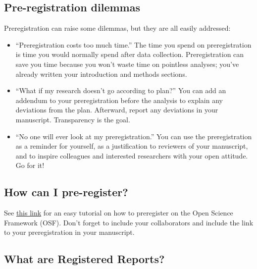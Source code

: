 \documentclass[
  letterpaper,
  DIV=11,
  numbers=noendperiod]{scrreprt}
\begin{document}
\hypertarget{pre-registration-dilemmas}{%
\subsection*{\texorpdfstring{\textbf{Pre-registration
dilemmas}}{Pre-registration dilemmas}}\label{pre-registration-dilemmas}}

Preregistration can raise some dilemmas, but they are all easily
addressed:

\begin{itemize}
\item
  ``Preregistration costs too much time.'' The time you spend on
  preregistration is time you would normally spend after data
  collection. Preregistration can save you time because you won't waste
  time on pointless analyses; you've already written your introduction
  and methods sections.
\item
  ``What if my research doesn't go according to plan?'' You can add an
  addendum to your preregistration before the analysis to explain any
  deviations from the plan. Afterward, report any deviations in your
  manuscript. Transparency is the goal.
\item
  ``No one will ever look at my preregistration.'' You can use the
  preregistration as a reminder for yourself, as a justification to
  reviewers of your manuscript, and to inspire colleagues and interested
  researchers with your open attitude. Go for it!
\end{itemize}

\hypertarget{how-can-i-pre-register}{%
\subsection*{\texorpdfstring{\textbf{How can I
pre-register?}}{How can I pre-register?}}\label{how-can-i-pre-register}}

See \href{https://osf.io/sgrk6/}{this link} for an easy tutorial on how
to preregister on the Open Science Framework (OSF). Don't forget to
include your collaborators and include the link to your preregistration
in your manuscript.

\hypertarget{what-are-registered-reports}{%
\subsection*{\texorpdfstring{\textbf{What are Registered
Reports?}}{What are Registered Reports?}}\label{what-are-registered-reports}}
\end{document}
